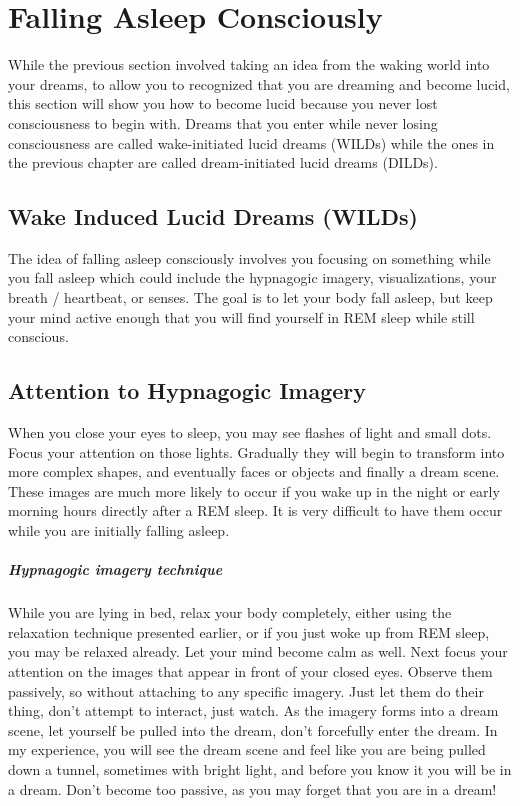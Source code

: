 \documentclass{report}
\begin{document}
\chapter{Falling Asleep Consciously}
While the previous section involved taking an idea from the waking world into your dreams, to allow you to recognized that you are dreaming and become lucid, this section will show you how to become lucid because you never lost consciousness to begin with. Dreams that you enter while never losing consciousness are called wake-initiated lucid dreams (WILDs) while the ones in the previous chapter are called dream-initiated lucid dreams (DILDs).

\section{Wake Induced Lucid Dreams (WILDs)}
The idea of falling asleep consciously involves you focusing on something while you fall asleep which could include the hypnagogic imagery, visualizations, your breath / heartbeat, or senses. The goal is to let your body fall asleep, but keep your mind active enough that you will find yourself in REM sleep while still conscious.

\section{Attention to Hypnagogic Imagery}
When you close your eyes to sleep, you may see flashes of light and small dots. Focus your attention on those lights. Gradually they will begin to transform into more complex shapes, and eventually faces or objects and finally a dream scene. These images are much more likely to occur if you wake up in the night or early morning hours directly after a REM sleep. It is very difficult to have them occur while you are initially falling asleep.

\paragraph{Hypnagogic imagery technique} While you are lying in bed, relax your body completely, either using the relaxation technique presented earlier, or if you just woke up from REM sleep, you may be relaxed already. Let your mind become calm as well. Next focus your attention on the images that appear in front of your closed eyes. Observe them passively, so without attaching to any specific imagery. Just let them do their thing, don't attempt to interact, just watch. As the imagery forms into a dream scene, let yourself be pulled into the dream, don't forcefully enter the dream. In my experience, you will see the dream scene and feel like you are being pulled down a tunnel, sometimes with bright light, and before you know it you will be in a dream. Don't become too passive, as you may forget that you are in a dream!
\end{document}
